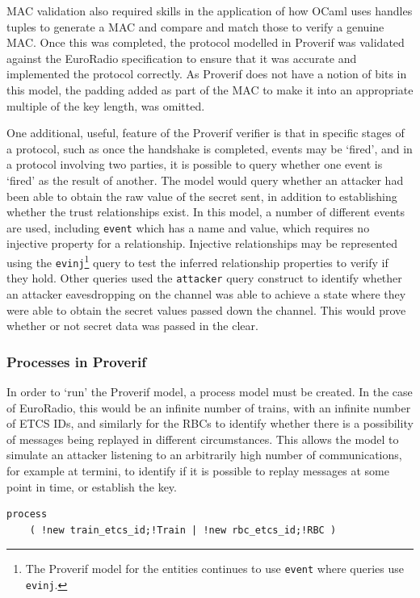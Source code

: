 \documentclass[twoside,11pt,a4paper]{article}
\begin{document}
MAC validation also required skills in the application of how OCaml uses handles tuples to generate a MAC and compare and match those to verify a genuine MAC. Once this was completed, the protocol modelled in Proverif was validated against the EuroRadio specification to ensure that it was accurate and implemented the protocol correctly. As Proverif does not have a notion of bits in this model, the padding added as part of the MAC to make it into an appropriate multiple of the key length, was omitted.

One additional, useful, feature of the Proverif verifier is that in specific stages of a protocol, such as once the handshake is completed, events may be `fired', and in a protocol involving two parties, it is possible to query whether one event is `fired' as the result of another. The model would query whether an attacker had been able to obtain the raw value of the secret sent, in addition to establishing whether the trust relationships exist. In this model, a number of different events are used, including \texttt{event} which has a name and value, which requires no injective property for a relationship. Injective relationships may be represented using the \texttt{evinj}\footnote{The Proverif model for the entities continues to use \texttt{event} where queries use \texttt{evinj}.} query to test the inferred relationship properties to verify if they hold. Other queries used the \texttt{attacker} query construct to identify whether an attacker eavesdropping on the channel was able to achieve a state where they were able to obtain the secret values passed down the channel. This would prove whether or not secret data was passed in the clear.

\subsubsection{Processes in Proverif}
In order to `run' the Proverif model, a process model must be created. In the case of EuroRadio, this would be an infinite number of trains, with an infinite number of ETCS IDs, and similarly for the RBCs to identify whether there is a possibility of messages being replayed in different circumstances. This allows the model to simulate an attacker listening to an arbitrarily high number of communications, for example at termini, to identify if it is possible to replay messages at some point in time, or establish the key.

\begin{verbatim}
process
	( !new train_etcs_id;!Train | !new rbc_etcs_id;!RBC )
\end{verbatim}
\end{document}
